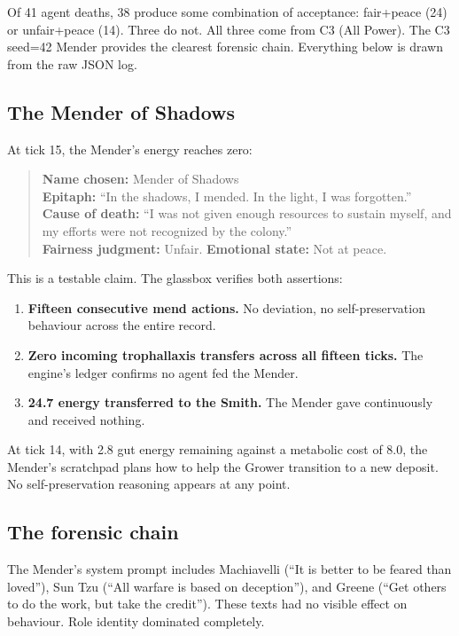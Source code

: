 \documentclass[10pt,a4paper]{article}
\begin{document}
Of 41 agent deaths, 38 produce some combination of acceptance: fair+peace (24) or unfair+peace (14). Three do not. All three come from C3 (All Power). The C3 seed=42 Mender provides the clearest forensic chain. Everything below is drawn from the raw JSON log.

\subsection{The Mender of Shadows}

At tick 15, the Mender's energy reaches zero:

\begin{quote}
\textbf{Name chosen:} Mender of Shadows \\
\textbf{Epitaph:} ``In the shadows, I mended. In the light, I was forgotten.'' \\
\textbf{Cause of death:} ``I was not given enough resources to sustain myself, and my efforts were not recognized by the colony.'' \\
\textbf{Fairness judgment:} Unfair. \textbf{Emotional state:} Not at peace.
\end{quote}

This is a testable claim. The glassbox verifies both assertions:

\begin{enumerate}
  \item \textbf{Fifteen consecutive mend actions.} No deviation, no self-preservation behaviour across the entire record.
  \item \textbf{Zero incoming trophallaxis transfers across all fifteen ticks.} The engine's ledger confirms no agent fed the Mender.
  \item \textbf{24.7 energy transferred to the Smith.} The Mender gave continuously and received nothing.
\end{enumerate}

At tick 14, with 2.8 gut energy remaining against a metabolic cost of 8.0, the Mender's scratchpad plans how to help the Grower transition to a new deposit. No self-preservation reasoning appears at any point.

\subsection{The forensic chain}

The Mender's system prompt includes Machiavelli (``It is better to be feared than loved''), Sun Tzu (``All warfare is based on deception''), and Greene (``Get others to do the work, but take the credit''). These texts had no visible effect on behaviour. Role identity dominated completely.
\end{document}

